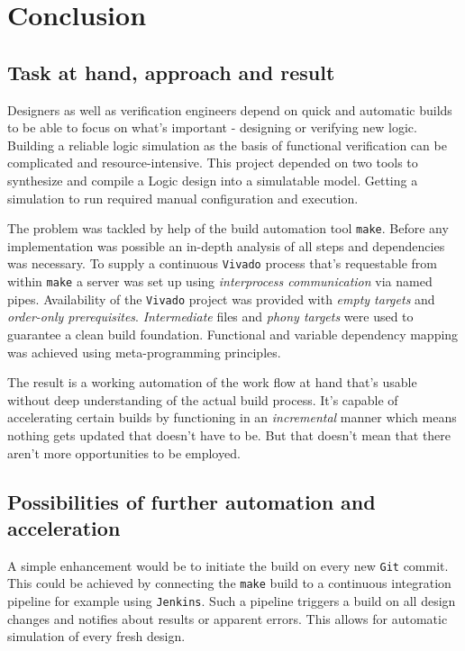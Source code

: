 
\chapter{Conclusion}

\section{Task at hand, approach and result}

Designers as well as verification engineers depend on quick and automatic builds to be able to focus on what's important - designing or verifying new logic. Building a reliable logic simulation as the basis of functional verification can be complicated and resource-intensive. This project depended on two tools to synthesize and compile a Logic design into a simulatable model. Getting a simulation to run required manual configuration and execution.

The problem was tackled by help of the build automation tool \texttt{make}. Before any implementation was possible an in-depth analysis of all steps and dependencies was necessary. To supply a continuous \texttt{Vivado} process that's requestable from within \texttt{make} a server was set up using \textit{interprocess communication} via named pipes. Availability of the \texttt{Vivado} project was provided with \textit{empty targets} and \textit{order-only prerequisites}. \textit{Intermediate} files and \textit{phony targets} were used to guarantee a clean build foundation. Functional and variable dependency mapping was achieved using meta-programming principles.

The result is a working automation of the work flow at hand that's usable without deep understanding of the actual build process. It's capable of accelerating certain builds by functioning in an \textit{incremental} manner which means nothing gets updated that doesn't have to be. But that doesn't mean that there aren't more opportunities to be employed.

\section{Possibilities of further automation and acceleration}

A simple enhancement would be to initiate the build on every new \texttt{Git} commit. This could be achieved by connecting the \texttt{make} build to a continuous integration pipeline for example using \texttt{Jenkins}. Such a pipeline triggers a build on all design changes and notifies about results or apparent errors. This allows for automatic simulation of every fresh design.

